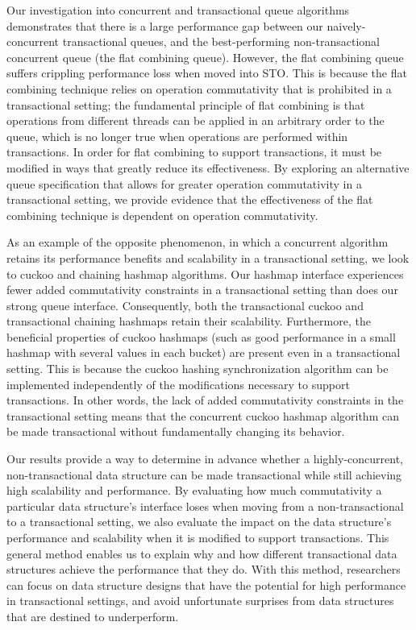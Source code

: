 Our investigation into concurrent and transactional queue algorithms demonstrates that there is a large performance gap between our naively-concurrent transactional queues, and the best-performing non-transactional concurrent queue (the flat combining queue). However, the flat combining queue suffers crippling performance loss when moved into STO. This is because the flat combining technique relies on operation commutativity that is prohibited in a transactional setting; the fundamental principle of flat combining is that operations from different threads can be applied in an arbitrary order to the queue, which is no longer true when operations are performed within transactions. In order for flat combining to support transactions, it must be modified in ways that greatly reduce its effectiveness. By exploring an alternative queue specification that allows for greater operation commutativity in a transactional setting, we provide evidence that the effectiveness of the flat combining technique is dependent on operation commutativity.

As an example of the opposite phenomenon, in which a concurrent algorithm retains its performance benefits and scalability in a transactional setting, we look to cuckoo and chaining hashmap algorithms. Our hashmap interface experiences fewer added commutativity constraints in a transactional setting than does our strong queue interface. Consequently, both the transactional cuckoo and transactional chaining hashmaps retain their scalability.
Furthermore, the beneficial properties of cuckoo hashmaps (such as good performance in a small hashmap with several values in each bucket) are present even in a transactional setting. This is because the cuckoo hashing synchronization algorithm can be implemented independently of the modifications necessary to support transactions. In other words, the lack of added commutativity constraints in the transactional setting means that the concurrent cuckoo hashmap algorithm can be made transactional without fundamentally changing its behavior.

Our results provide a way to determine in advance whether a highly-concurrent, non-transactional data structure can be made transactional while still achieving high scalability and performance. By evaluating how much commutativity a particular data structure's interface loses when moving from a non-transactional to a transactional setting, we also evaluate the impact on the data structure's performance and scalability when it is modified to support transactions. 
This general method enables us to explain why and how different transactional data structures achieve the performance that they do. With this method, researchers can focus on data structure designs that have the potential for high performance in transactional settings, and avoid unfortunate surprises from data structures that are destined to underperform.
